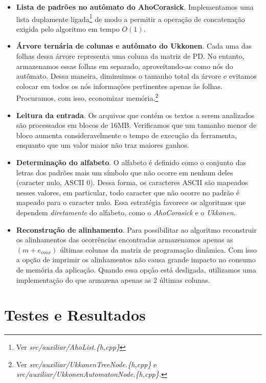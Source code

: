 \documentclass[]{article}
\begin{document}
\begin{itemize}
	\item \textbf{Lista de padrões no autômato do AhoCorasick}. Implementamos uma lista duplamente ligada\footnote{Ver \textit{src/auxiliar/AhoList.\{h,cpp\}}} de modo a permitir a operação de concatenação exigida pelo algoritmo em tempo $O(1)$.

	\item \textbf{Árvore ternária de colunas e autômato do Ukkonen}. Cada uma das folhas dessa árvore representa uma coluna da matriz de PD. No entanto, armazenamos essas folhas em separado, aproveitando-as como nós do autômato. Dessa maneira, diminuimos o tamanho total da árvore e evitamos colocar em todos os nós informações pertinentes apenas às folhas. Procuramos, com isso, economizar memória.\footnote{Ver \textit{src/auxiliar/UkkonenTreeNode.\{h,cpp\}} e \textit{src/auxiliar/UkkonenAutomatonNode.\{h,cpp\}.}}

	\item \textbf{Leitura da entrada}. Os arquivos que contém os textos a serem analizados são processados em blocos de 16MB. Verificamos que um tamanho menor de bloco aumenta consideravelmente o tempo de execução da ferramenta, enquanto que um valor maior não traz maiores ganhos.

	\item \textbf{Determinação do alfabeto}. O alfabeto é definido como o conjunto das letras dos padrões mais um símbolo que não ocorre em nenhum deles (caracter nulo, ASCII 0). Dessa forma, os caracteres ASCII são mapeados nesses valores, em particular, todo caracter que não ocorre no padrão é mapeado para o caracter nulo. Essa estratégia favorece os algoritmos que dependem \textit{diretamente} do alfabeto, como o \textit{AhoCorasick} e o \textit{Ukkonen}.

	\item \textbf{Reconstrução de alinhamento}. Para possibilitar ao algoritmo \SE reconstruir os alinhamentos das ocorrências encontradas armazenamos apenas as $(m+e_{max})$ últimas colunas da matriz de programação dinâmica. Com isso a opção de imprimir os alinhamentos não causa grande impacto no consumo de memória da aplicação. Quando essa opção está desligada, utilizamos uma implementação do \SE que armazena apenas as 2 últimas colunas.
\end{itemize}

\section{Testes e Resultados}
\end{document}
